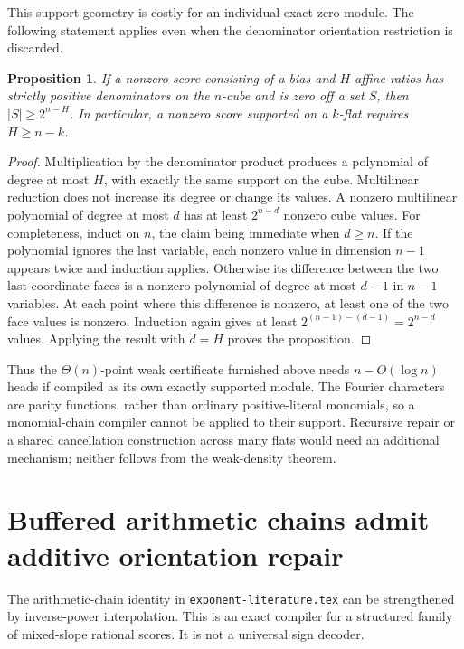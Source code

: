 \documentclass[11pt]{article}
\newtheorem{proposition}[theorem]{Proposition}
\begin{document}
This support geometry is costly for an individual exact-zero module.
The following statement applies even when the denominator orientation
restriction is discarded.

\begin{proposition}\label{prop:sparse-weak-score}
If a nonzero score consisting of a bias and $H$ affine ratios has
strictly positive denominators on the $n$-cube and is zero off a set
$S$, then $|S|\geq2^{n-H}$. In particular, a nonzero score supported
on a $k$-flat requires $H\geq n-k$.
\end{proposition}

\begin{proof}
Multiplication by the denominator product produces a polynomial of
degree at most $H$, with exactly the same support on the cube.
Multilinear reduction does not increase its degree or change its
values. A nonzero multilinear polynomial of degree at most $d$ has
at least $2^{n-d}$ nonzero cube values. For completeness, induct on
$n$, the claim being immediate when $d\geq n$. If the polynomial
ignores the last variable, each nonzero value in dimension $n-1$
appears twice and induction applies. Otherwise its difference between
the two last-coordinate faces is a nonzero polynomial of degree at
most $d-1$ in $n-1$ variables. At each point where this difference
is nonzero, at least one of the two face values is nonzero. Induction
again gives at least $2^{(n-1)-(d-1)}=2^{n-d}$ values.
Applying the result with $d=H$ proves the proposition.
\end{proof}

Thus the $\Theta(n)$-point weak certificate furnished above needs
$n-O(\log n)$ heads if compiled as its own exactly supported module.
The Fourier characters are parity functions, rather than ordinary
positive-literal monomials, so a monomial-chain compiler cannot be
applied to their support. Recursive repair or a shared cancellation
construction across many flats would need an additional mechanism;
neither follows from the weak-density theorem.

\section{Buffered arithmetic chains admit additive orientation repair}

The arithmetic-chain identity in \texttt{exponent-literature.tex} can
be strengthened by inverse-power interpolation. This is an exact
compiler for a structured family of mixed-slope rational scores.
It is not a universal sign decoder.
\end{document}
